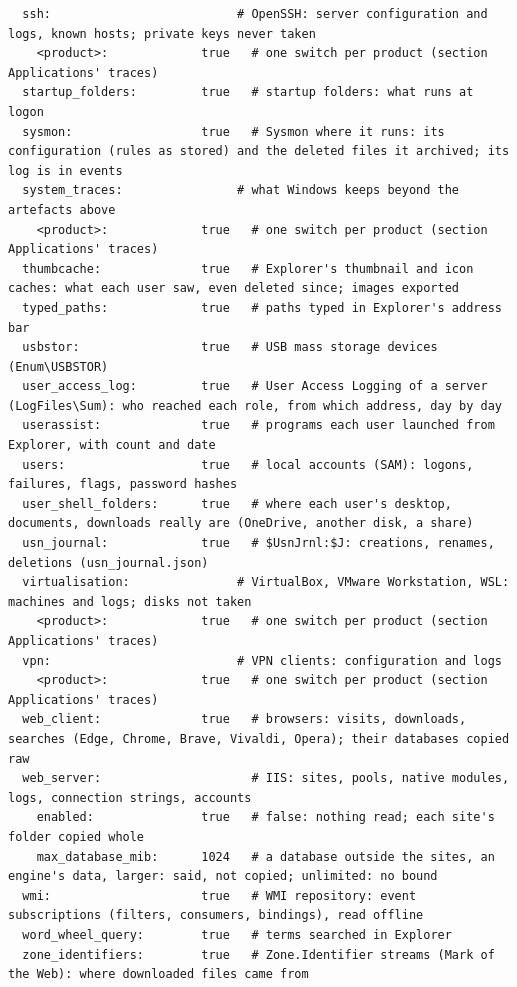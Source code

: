 \documentclass[11pt,a4paper,oneside]{report}
\begin{document}
\begin{lstlisting}
  ssh:                          # OpenSSH: server configuration and logs, known hosts; private keys never taken
    <product>:             true   # one switch per product (section Applications' traces)
  startup_folders:         true   # startup folders: what runs at logon
  sysmon:                  true   # Sysmon where it runs: its configuration (rules as stored) and the deleted files it archived; its log is in events
  system_traces:                # what Windows keeps beyond the artefacts above
    <product>:             true   # one switch per product (section Applications' traces)
  thumbcache:              true   # Explorer's thumbnail and icon caches: what each user saw, even deleted since; images exported
  typed_paths:             true   # paths typed in Explorer's address bar
  usbstor:                 true   # USB mass storage devices (Enum\USBSTOR)
  user_access_log:         true   # User Access Logging of a server (LogFiles\Sum): who reached each role, from which address, day by day
  userassist:              true   # programs each user launched from Explorer, with count and date
  users:                   true   # local accounts (SAM): logons, failures, flags, password hashes
  user_shell_folders:      true   # where each user's desktop, documents, downloads really are (OneDrive, another disk, a share)
  usn_journal:             true   # $UsnJrnl:$J: creations, renames, deletions (usn_journal.json)
  virtualisation:               # VirtualBox, VMware Workstation, WSL: machines and logs; disks not taken
    <product>:             true   # one switch per product (section Applications' traces)
  vpn:                          # VPN clients: configuration and logs
    <product>:             true   # one switch per product (section Applications' traces)
  web_client:              true   # browsers: visits, downloads, searches (Edge, Chrome, Brave, Vivaldi, Opera); their databases copied raw
  web_server:                     # IIS: sites, pools, native modules, logs, connection strings, accounts
    enabled:               true   # false: nothing read; each site's folder copied whole
    max_database_mib:      1024   # a database outside the sites, an engine's data, larger: said, not copied; unlimited: no bound
  wmi:                     true   # WMI repository: event subscriptions (filters, consumers, bindings), read offline
  word_wheel_query:        true   # terms searched in Explorer
  zone_identifiers:        true   # Zone.Identifier streams (Mark of the Web): where downloaded files came from
\end{lstlisting}
\end{document}
